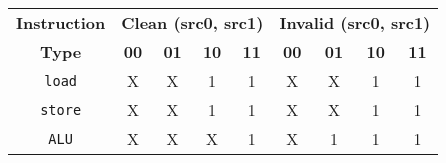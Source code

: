

\begin{tabular}{|c||c|c|c|c||c|c|c|c|}
\hline

{\bf Instruction} & \multicolumn{4}{c||}{\bf Clean (src0, src1)} & \multicolumn{4}{c|}{\bf Invalid (src0, src1)} \\ \cline{2-9}
{\bf Type} & {\bf 00} & {\bf 01} & {\bf 10} & {\bf 11} & {\bf 00} & {\bf 01} & {\bf 10} & {\bf 11} \\ \hline\hline

{\tt load} & X & X & 1 & 1 & X & X & 1 & 1 \\ \hline
{\tt store} & X & X & 1 & 1 & X & X & 1 & 1 \\ \hline
{\tt ALU} & X & X & X & 1 & X & 1 & 1 & 1 \\ \hline

\end{tabular}

